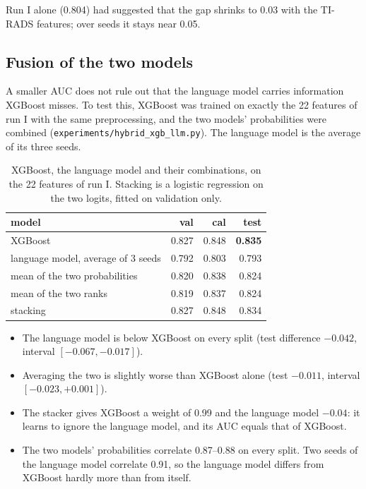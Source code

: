 Run I alone (0.804) had suggested that the gap shrinks to 0.03 with the TI-RADS features; over
seeds it stays near 0.05.

\subsection{Fusion of the two models}
\label{sec:results-fusion}

A smaller AUC does not rule out that the language model carries information XGBoost misses. To
test this, XGBoost was trained on exactly the 22 features of run I with the same preprocessing,
and the two models' probabilities were combined (\texttt{experiments/hybrid\_xgb\_llm.py}). The
language model is the average of its three seeds.

\begin{table}[ht]
  \centering
  \caption{XGBoost, the language model and their combinations, on the 22 features of run I.
           Stacking is a logistic regression on the two logits, fitted on validation only.}
  \label{tab:results-fusion}
  \begin{tabular}{lrrr}
    \toprule
    model & val & cal & test \\
    \midrule
    XGBoost                                  & 0.827 & 0.848 & \textbf{0.835} \\
    language model, average of 3 seeds       & 0.792 & 0.803 & 0.793 \\
    mean of the two probabilities            & 0.820 & 0.838 & 0.824 \\
    mean of the two ranks                    & 0.819 & 0.837 & 0.824 \\
    stacking                                 & 0.827 & 0.848 & 0.834 \\
    \bottomrule
  \end{tabular}
\end{table}

\begin{itemize}
  \item The language model is below XGBoost on every split (test difference $-0.042$, interval
        $[-0.067, -0.017]$).
  \item Averaging the two is slightly worse than XGBoost alone (test $-0.011$, interval
        $[-0.023, +0.001]$).
  \item The stacker gives XGBoost a weight of 0.99 and the language model $-0.04$: it learns to
        ignore the language model, and its AUC equals that of XGBoost.
  \item The two models' probabilities correlate 0.87--0.88 on every split. Two seeds of the
        language model correlate 0.91, so the language model differs from XGBoost hardly more
        than from itself.
\end{itemize}

